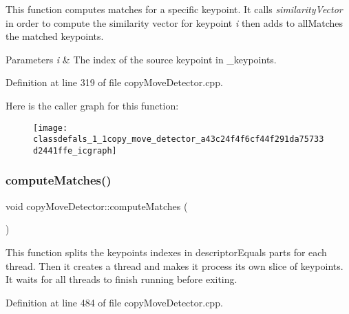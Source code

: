 This function computes matches for a specific keypoint. It calls {\itshape similarity\+Vector} in order to compute the similarity vector for keypoint {\itshape i} then adds to all\+Matches the matched keypoints.


\begin{DoxyParams}{Parameters}
{\em i} & The index of the source keypoint in \+\_\+keypoints. \\
\hline
\end{DoxyParams}


Definition at line 319 of file copy\+Move\+Detector.\+cpp.

Here is the caller graph for this function\+:\nopagebreak
\begin{figure}[H]
\begin{center}
\leavevmode
\texttt{[image: classdefals\_1\_1copy\_move\_detector\_a43c24f4f6cf44f291da75733d2441ffe\_icgraph]}
\end{center}
\end{figure}
\mbox{\label{classdefals_1_1copy_move_detector_ad92c77ad47c3af47b8d2383a7a6b2753}} 
\subsubsection{\texorpdfstring{compute\+Matches()}{computeMatches()}}
{\footnotesize\ttfamily void copy\+Move\+Detector\+::compute\+Matches (\begin{DoxyParamCaption}{ }\end{DoxyParamCaption})\hspace{0.3cm}{\ttfamily [private]}}

This function splits the keypoints indexes in descriptor\+Equals parts for each thread. Then it creates a thread and makes it process its own slice of keypoints. It waits for all threads to finish running before exiting. 

Definition at line 484 of file copy\+Move\+Detector.\+cpp.

\mbox{\label{classdefals_1_1copy_move_detector_a4eba5b33edb3a8aef5e19f769a17a3d8}} 
